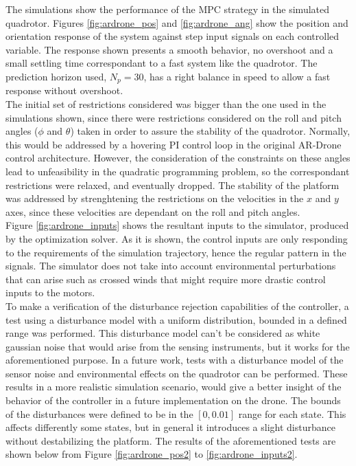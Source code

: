 The simulations show the performance of the MPC strategy in the simulated quadrotor. Figures \ref{fig:ardrone_pos} and \ref{fig:ardrone_ang} show the position and orientation  response of the system against step input signals on each controlled variable. The response shown presents a smooth behavior, no overshoot and a small settling time correspondant to a fast system like the quadrotor. The prediction horizon used, $N_p = 30$, has a right balance in speed to allow a fast response without overshoot.\\

The initial set of restrictions considered was bigger than the one used in the simulations shown, since there were restrictions considered on the roll and pitch angles ($\phi$ and $\theta$) taken in order to assure the stability of the quadrotor. Normally, this would be addressed by a hovering PI control loop in the original AR-Drone control architecture. However, the consideration of the constraints on these angles lead to unfeasibility in the quadratic programming problem, so  the correspondant restrictions were relaxed, and eventually dropped. The stability of the platform was addressed by strenghtening the restrictions on the velocities in the $x$ and $y$ axes, since these velocities are dependant on the roll and pitch angles. \\

Figure \ref{fig:ardrone_inputs} shows the resultant inputs to the simulator, produced by the optimization solver. As it is shown, the control inputs are only responding to the requirements of the simulation trajectory, hence the regular pattern in the signals. The simulator does not take into account environmental perturbations that can arise such as crossed winds that might require more drastic control inputs to the motors.  \\

To make a verification of the disturbance rejection capabilities of the controller, a test using a disturbance model with a uniform distribution, bounded in a defined range was performed. This disturbance model can't be considered as white gaussian noise that would arise from the sensing instruments, but it works for the aforementioned purpose. In a future work, tests with a disturbance model of the sensor noise and environmental effects on the quadrotor can be performed. These results in a more realistic simulation scenario, would give a better insight of the behavior of the controller in a future implementation on the drone. The bounds of the disturbances were defined to be in the $[0, 0.01]$ range for each state. This affects differently some states, but in general it introduces a slight disturbance without destabilizing the platform. The results of the aforementioned tests are shown below from Figure \ref{fig:ardrone_pos2} to \ref{fig:ardrone_inputs2}.\\

